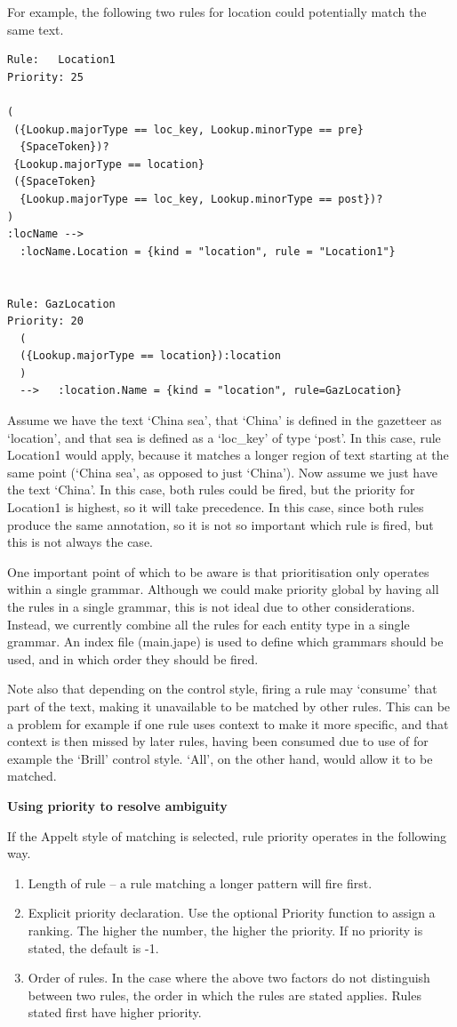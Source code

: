 For example, the following two rules for location could potentially match the
same text.

\begin{small}
\begin{verbatim}
Rule:   Location1
Priority: 25

(
 ({Lookup.majorType == loc_key, Lookup.minorType == pre}
  {SpaceToken})?
 {Lookup.majorType == location}
 ({SpaceToken}
  {Lookup.majorType == loc_key, Lookup.minorType == post})?
)
:locName -->
  :locName.Location = {kind = "location", rule = "Location1"}


Rule: GazLocation
Priority: 20
  (
  ({Lookup.majorType == location}):location
  )
  -->   :location.Name = {kind = "location", rule=GazLocation}
\end{verbatim}
\end{small}

Assume we have the text `China sea', that `China'
is defined in the gazetteer as `location', and that sea is defined as
a `loc\_key' of type `post'. In this case, rule Location1 would apply,
because it matches a longer region of text starting at the same point
(`China sea', as opposed to just `China'). Now assume we just have the
text `China'. In this case, both rules could be fired, but the
priority for Location1 is highest, so it will take precedence. In this
case, since both rules produce the same annotation, so it is not so
important which rule is fired, but this is not always the case.

One important point of which to be aware is that prioritisation only
operates within a single grammar. Although we could make priority
global by having all the rules in a single grammar, this is not ideal
due to other considerations. Instead, we currently combine all the
rules for each entity type in a single grammar. An index file
(main.jape) is used to define which grammars should be used, and in
which order they should be fired.

Note also that depending on the control style, firing a rule may `consume' that
part of the text, making it unavailable to be matched by other rules. This can
be a problem for example if one rule uses context to make it more specific, and
that context is then missed by later rules, having been consumed due to use of
for example the `Brill' control style. `All', on the other hand, would allow it
to be matched.

{\bf Using priority to resolve ambiguity}

If the Appelt style of matching is selected, rule priority operates in
the following way.
\begin{enumerate}
\item
Length of rule -- a rule matching a longer pattern will fire
first.
\item
Explicit priority declaration. Use the optional Priority function to
assign a ranking. The higher the number, the higher the priority. If
no priority is stated, the default is -1.
\item
Order of rules. In the case where the above two factors do not
distinguish between two rules, the order in which the rules are stated
applies. Rules stated first have higher priority.
\end{enumerate}

